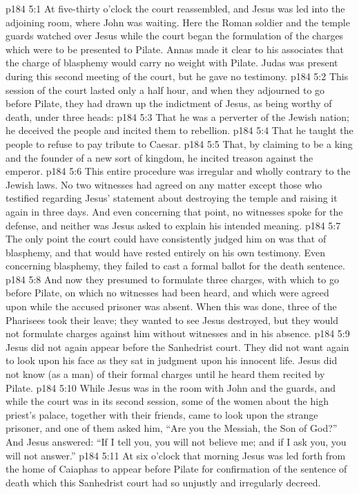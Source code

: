 \vs p184 5:1 At five\hyp{}thirty o’clock the court reassembled, and Jesus was led into the adjoining room, where John was waiting. Here the Roman soldier and the temple guards watched over Jesus while the court began the formulation of the charges which were to be presented to Pilate. Annas made it clear to his associates that the charge of blasphemy would carry no weight with Pilate. Judas was present during this second meeting of the court, but he gave no testimony.
\vs p184 5:2 This session of the court lasted only a half hour, and when they adjourned to go before Pilate, they had drawn up the indictment of Jesus, as being worthy of death, under three heads:
\vs p184 5:3 \bibnobreakspace That he was a perverter of the Jewish nation; he deceived the people and incited them to rebellion.
\vs p184 5:4 \bibnobreakspace That he taught the people to refuse to pay tribute to Caesar.
\vs p184 5:5 \bibnobreakspace That, by claiming to be a king and the founder of a new sort of kingdom, he incited treason against the emperor.
\vs p184 5:6 \pc This entire procedure was irregular and wholly contrary to the Jewish laws. No two witnesses had agreed on any matter except those who testified regarding Jesus’ statement about destroying the temple and raising it again in three days. And even concerning that point, no witnesses spoke for the defense, and neither was Jesus asked to explain his intended meaning.
\vs p184 5:7 The only point the court could have consistently judged him on was that of blasphemy, and that would have rested entirely on his own testimony. Even concerning blasphemy, they failed to cast a formal ballot for the death sentence.
\vs p184 5:8 And now they presumed to formulate three charges, with which to go before Pilate, on which no witnesses had been heard, and which were agreed upon while the accused prisoner was absent. When this was done, three of the Pharisees took their leave; they wanted to see Jesus destroyed, but they would not formulate charges against him without witnesses and in his absence.
\vs p184 5:9 Jesus did not again appear before the Sanhedrist court. They did not want again to look upon his face as they sat in judgment upon his innocent life. Jesus did not know (as a man) of their formal charges until he heard them recited by Pilate.
\vs p184 5:10 \pc While Jesus was in the room with John and the guards, and while the court was in its second session, some of the women about the high priest’s palace, together with their friends, came to look upon the strange prisoner, and one of them asked him, “Are you the Messiah, the Son of God?” And Jesus answered: \textcolor{ubdarkred}{“If I tell you, you will not believe me; and if I ask you, you will not answer.”}
\vs p184 5:11 At six o’clock that morning Jesus was led forth from the home of Caiaphas to appear before Pilate for confirmation of the sentence of death which this Sanhedrist court had so unjustly and irregularly decreed.
